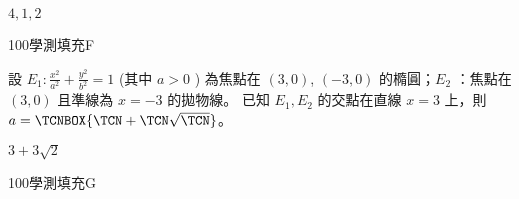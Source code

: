 \begin{QUESTIONS}
\begin{QUESTION}
\begin{QBODY}
        \end{QBODY}
        \begin{QFROMS}
        \end{QFROMS}
        \begin{QTAGS}\end{QTAGS}
        \begin{QANS}
            $4,1,2$
        \end{QANS}
        \begin{QSOLLIST}
        \end{QSOLLIST}
        \begin{QEMPTYSPACE}
        \end{QEMPTYSPACE}
    \end{QUESTION}
    \begin{QUESTION}
        \begin{ExamInfo}{100}{學測}{填充}{F}
        \end{ExamInfo}
        \begin{ExamAnsRateInfo}{27}{66}{14}{1}
        \end{ExamAnsRateInfo}
        \begin{QBODY}
            設 $E_1:  \frac{x^2}{a^2} +\frac{y^2}{b^2} =1$ (其中 $a>0$ ) 為焦點在 $(3,0)$, $(-3,0)$ 的橢圓；$E_2$ ：焦點在 $(3, 0)$ 且準線為 $x = -3$ 的拋物線。 已知 $E_1, E_2$ 的交點在直線 $x=3$ 上，則 $a=\TCNBOX{\TCN+\TCN\sqrt{\TCN}}$。
        \end{QBODY}
        \begin{QFROMS}
        \end{QFROMS}
        \begin{QTAGS}\end{QTAGS}
        \begin{QANS}
            $3+3\sqrt{2}$
        \end{QANS}
        \begin{QSOLLIST}
        \end{QSOLLIST}
        \begin{QEMPTYSPACE}
        \end{QEMPTYSPACE}
    \end{QUESTION}
    \begin{QUESTION}
        \begin{ExamInfo}{100}{學測}{填充}{G}
        \end{ExamInfo}
        \begin{ExamAnsRateInfo}{31}{74}{17}{2}

\end{ExamAnsRateInfo}
\end{QUESTION}
\end{QUESTIONS}
